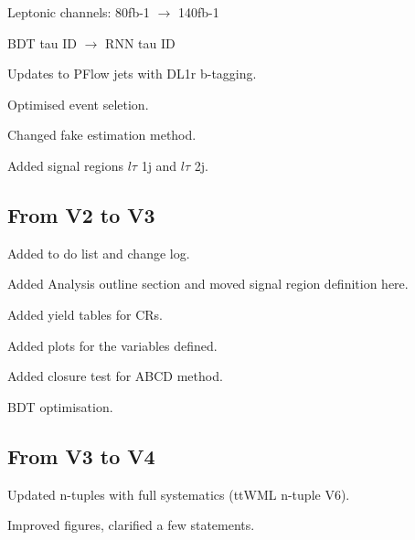 Leptonic channels:  80fb-1 $\to$ 140fb-1

BDT tau ID $\to$ RNN tau ID

Updates to PFlow jets with DL1r b-tagging.

Optimised event seletion.

Changed fake estimation method.

Added signal regions $l\tau$ 1j and $l\tau$ 2j.

\subsection{From V2 to V3}

Added to do list and change log.

Added Analysis outline section and moved signal region definition here.

Added yield tables for CRs.

Added plots for the variables defined.

Added closure test for ABCD method.

BDT optimisation.

\subsection{From V3 to V4}

Updated n-tuples with full systematics (ttWML n-tuple V6).

Improved figures, clarified a few statements.